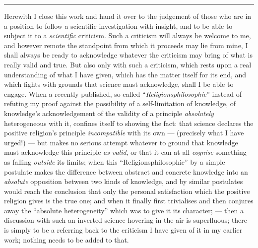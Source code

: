 \documentclass[12pt,a4paper]{book}
\begin{document}
\begin{center}\rule{2cm}{0.4pt}\end{center}

Herewith I close this work and hand it over to the judgement of those who are in
a position to follow a scientific investigation with insight, and to be able to
subject it to a \emph{scientific} criticism. Such a criticism will always be
welcome to me, and however remote the standpoint from which it proceeds may lie
from mine, I shall always be ready to acknowledge whatever the criticism may
bring of what is really valid and true. But also only with such a criticism,
which rests upon a real understanding of what I have given, which has the matter
itself for its end, and which fights with grounds that science must acknowledge,
shall I be able to engage. When a recently published, so-called
``\emph{Religionsphilosophie}'' instead of refuting my proof against the
possibility of a self-limitation of knowledge, of knowledge's acknowledgement of
the validity of a principle \emph{absolutely} heterogeneous with it, confines
itself to showing the fact:
that science declares the positive religion's principle \emph{incompatible} with
its own --- (precisely what I have urged!) --- but makes no serious attempt
whatever to ground that knowledge must acknowledge this principle \emph{as
valid}, or that it can at all \emph{cognise} something as falling
\emph{outside} its limits; when this ``Religionsphilosophie'' by a simple
postulate makes the difference between abstract and concrete knowledge into an
\emph{absolute} opposition between two kinds of knowledge, and by similar
postulates would reach the conclusion that only the personal satisfaction which
the positive religion gives is the true one; and when it finally first
trivialises and then conjures away the ``absolute heterogeneity'' which was to
give it its character; --- then a discussion with such an inverted science
hovering in the air is superfluous; there is simply to be a referring back to
the criticism I have given of it in my earlier work; nothing needs to be added
to that.
\end{document}
